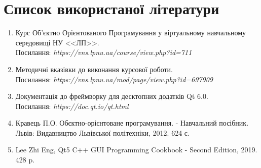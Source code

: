 \documentclass[oneside,14pt]{extarticle}
\begin{document}
\section*{Список використаної літератури}
\begin{enumerate}
	\item Курс Об'єктно Орієнтованого Програмування у віртуальному навчальному середовищі НУ <<ЛП>>.\\ Посилання: \textit{https://vns.lpnu.ua/course/view.php?id=711}
	\item Методичні вказівки до виконання курсової роботи. \\Посилання: \textit{https://vns.lpnu.ua/mod/page/view.php?id=697909}
	\item Документація до фреймворку для десктопних додатків Qt 6.0. \\ Посилання: \textit{https://doc.qt.io/qt.html}
	\item Кравець П.О. Обєктно-орієнтоване програмування. - Навчальний посібник. Львів: Видавництво Львівської політехніки, 2012. 624 с.
	\item Lee Zhi Eng, Qt5 C++ GUI Programming Cookbook - Second Edition, 2019. 428 p.
\end{enumerate}
\end{document}
